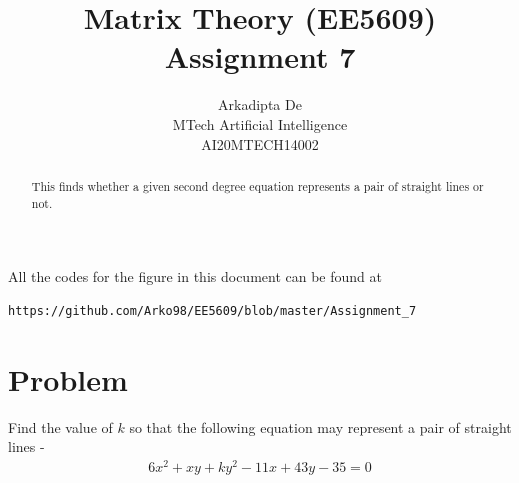 \documentclass[journal,12pt,twocolumn]{IEEEtran}
\begin{document}
\makeatletter
{}
\makeatother
\let\StandardTheFigure\thefigure
\let\vec\mathbf
\renewcommand{\thefigure}{\theproblem}
\def\putbox#1#2#3{\makebox[0in][l]{\makebox[#1][l]{}\raisebox{\baselineskip}[0in][0in]{\raisebox{#2}[0in][0in]{#3}}}}
     \def\rightbox#1{\makebox[0in][r]{#1}}
     \def\centbox#1{\makebox[0in]{#1}}
     \def\topbox#1{\raisebox{-\baselineskip}[0in][0in]{#1}}
     \def\midbox#1{\raisebox{-0.5\baselineskip}[0in][0in]{#1}}
\vspace{3cm}
\title{Matrix Theory (EE5609) Assignment 7}
\author{Arkadipta De\\MTech Artificial Intelligence\\AI20MTECH14002}

\maketitle
\newpage
\bigskip
\renewcommand{\thefigure}{\theenumi}
\renewcommand{\thetable}{\theenumi}

\begin{abstract}
This finds whether a given second degree equation represents a pair of straight lines or not.
\end{abstract}

All the codes for the figure in this document can be found at
\begin{lstlisting}
https://github.com/Arko98/EE5609/blob/master/Assignment_7
\end{lstlisting}

\section{Problem}
Find the value of $k$ so that the following equation may represent a pair of straight lines - 
\begin{align*}
6x^2 +xy+ky^2-11x+43y-35 = 0
\end{align*}

\end{document}
